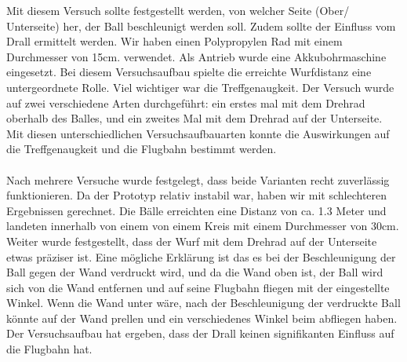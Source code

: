Mit diesem Versuch sollte festgestellt werden, von welcher Seite (Ober/ Unterseite) her, der Ball beschleunigt werden soll. Zudem sollte der Einfluss vom Drall ermittelt werden. Wir haben einen Polypropylen Rad mit einem Durchmesser von 15cm. verwendet. Als Antrieb wurde eine Akkubohrmaschine eingesetzt. Bei diesem Versuchsaufbau spielte die erreichte Wurfdistanz eine untergeordnete Rolle. Viel wichtiger war die Treffgenaugkeit.  
Der Versuch wurde auf zwei verschiedene Arten durchgeführt: ein erstes mal mit dem Drehrad oberhalb des Balles, und ein zweites Mal mit dem Drehrad auf der Unterseite. Mit diesen unterschiedlichen Versuchsaufbauarten konnte die Auswirkungen auf die Treffgenaugkeit und die Flugbahn bestimmt werden.\\ \\
Nach mehrere Versuche wurde festgelegt, dass beide Varianten recht zuverlässig funktionieren. Da der Prototyp relativ instabil war, haben wir mit schlechteren Ergebnissen gerechnet. Die Bälle erreichten eine Distanz von ca. 1.3 Meter und landeten innerhalb von einem von einem Kreis mit einem Durchmesser von 30cm. 
\\Weiter wurde festgestellt, dass der Wurf mit dem Drehrad auf der Unterseite etwas präziser ist. Eine mögliche Erklärung ist das es bei der Beschleunigung der Ball gegen der Wand verdruckt wird, und da die Wand oben ist, der Ball wird sich von die Wand entfernen und auf seine Flugbahn fliegen mit der eingestellte Winkel. Wenn die Wand unter wäre, nach der Beschleunigung der verdruckte Ball könnte auf der Wand prellen und ein verschiedenes Winkel beim abfliegen haben. Der Versuchsaufbau hat ergeben, dass der Drall keinen signifikanten Einfluss auf die Flugbahn hat.\\
